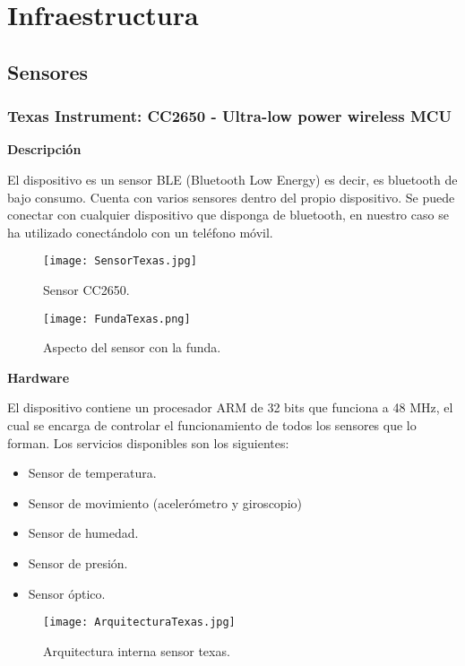 \documentclass[11pt,spanish]{article}
\begin{document}
\section{Infraestructura}
\subsection{Sensores}
\subsubsection{Texas Instrument: CC2650 - Ultra-low power wireless MCU}
{\bf Descripción}
\newline

El dispositivo es un sensor BLE (Bluetooth Low Energy) es decir, es bluetooth de bajo consumo. Cuenta con varios sensores dentro del propio dispositivo. Se puede conectar con cualquier dispositivo que disponga de bluetooth, en nuestro caso se ha utilizado conectándolo con un teléfono móvil. 

\begin{figure}[h!]
  \centering
  \texttt{[image: SensorTexas.jpg]}
  \caption{Sensor CC2650.}
\end{figure}

\begin{figure}[h!]
  \centering
  \texttt{[image: FundaTexas.png]}
  \caption{Aspecto del sensor con la funda.}
\end{figure}

{\bf Hardware}
\newline

El dispositivo contiene un procesador ARM de 32 bits que funciona a 48 MHz, el cual se encarga de controlar el funcionamiento de todos los sensores que lo forman. Los servicios disponibles son los siguientes:

\begin{itemize}
  \item Sensor de temperatura.
  \item Sensor de movimiento (acelerómetro y giroscopio)
  \item Sensor de humedad.
  \item Sensor de presión.
  \item Sensor óptico.
\end{itemize}

\begin{figure}[h!]
  \centering
  \texttt{[image: ArquitecturaTexas.jpg]}
  \caption{Arquitectura interna sensor texas.}
\end{figure}
\end{document}
